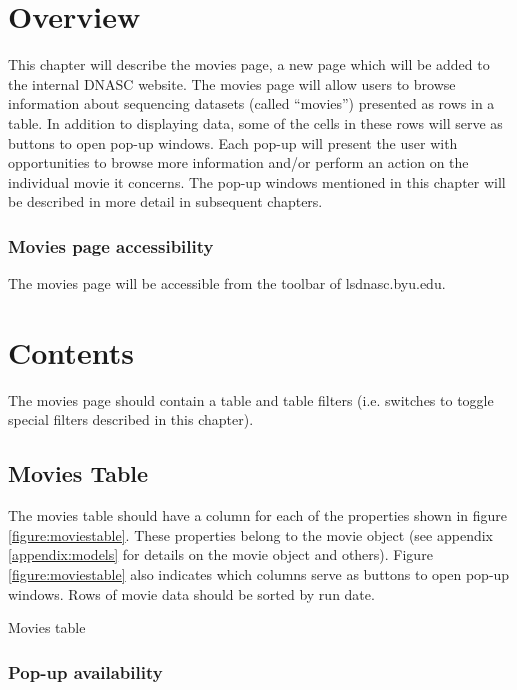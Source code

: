 
\section{Overview}

This chapter will describe the movies page, a new page which will be added to the internal 
DNASC website. The movies page will allow users to browse information about sequencing datasets 
(called ``movies'') presented as rows in a table. In addition to displaying data, some of the 
cells in these rows will serve as buttons to open pop-up windows. Each pop-up will present 
the user with opportunities to browse more information and/or perform an action on the 
individual movie it concerns. The pop-up windows mentioned in this chapter will be described 
in more detail in subsequent chapters. 

\subsubsection{Movies page accessibility}

The movies page will be accessible from the toolbar of lsdnasc.byu.edu.

\section{Contents}

The movies page should contain a table and table filters (i.e. switches to toggle special 
filters described in this chapter).

\subsection{Movies Table}

The movies table should have a column for each of the properties shown in figure 
\ref{figure:moviestable}. These properties belong to the movie object (see appendix 
\ref{appendix:models} for details on the movie object and others). Figure 
\ref{figure:moviestable} also indicates which columns serve as buttons to open pop-up 
windows. Rows of movie data should be sorted by run date.

\begin{table}[h]
    
    \caption{Movies table}
    \label{figure:moviestable}
\end{table}

\subsubsection{Pop-up availability}


